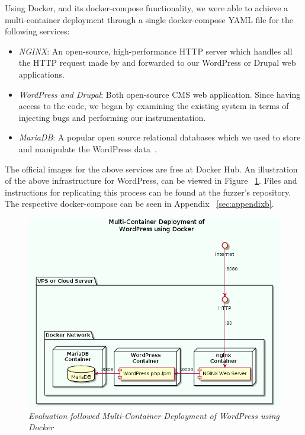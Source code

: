 Using Docker, and its docker-compose functionality, we were able to achieve a multi-container deployment through a single docker-compose YAML file for the following services:

\begin{itemize}
	\item \emph{NGINX}: An open-source, high-performance HTTP server which handles all the HTTP request made by \pname{} and forwarded to our WordPress or Drupal web applications.{~\cite{nginx}}
	\item \emph{WordPress and Drupal}: Both open-source CMS web application. Since having access to the code, we began by examining the existing system in terms of injecting bugs and performing our instrumentation.
	\item \emph{MariaDB}: A popular open source relational databases which we used to store and manipulate the WordPress data~\cite{mariadb}.
\end{itemize}

The official images for the above services are free at Docker Hub. An illustration of the above infrastructure for WordPress, can be viewed in Figure ~\ref{fig:multi-container}. Files and instructions for replicating this process can be found at the fuzzer's repository. The respective docker-compose can be seen in Appendix ~\ref{sec:appendixb}.

\begin{figure}[ht]
 \centering
 \captionsetup{justification=centering}
 \includegraphics[width=\linewidth]{figures/multi-container.png}
 \caption[Multi-Container Deployment of WordPress using Docker]{\textit{Evaluation followed Multi-Container Deployment of WordPress using Docker} ~\cite{multi-container}}
 \label{fig:multi-container}
\end{figure}

